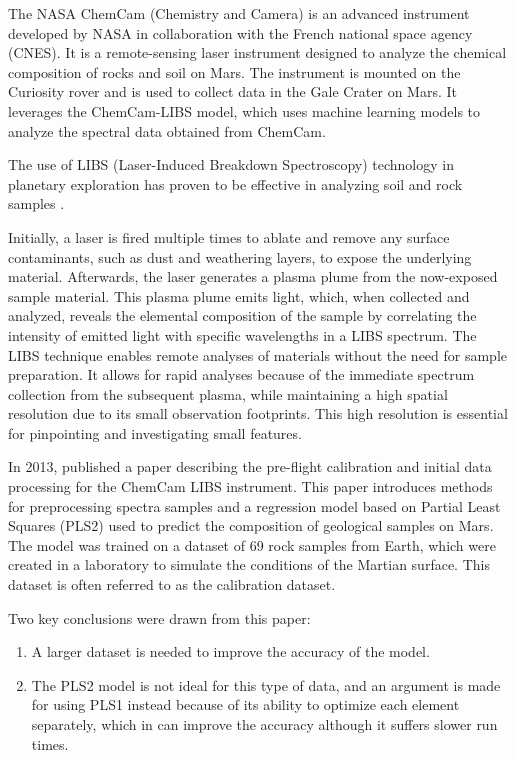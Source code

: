
The NASA ChemCam (Chemistry and Camera) is an advanced instrument developed by NASA in collaboration with the French national space agency (CNES).
It is a remote-sensing laser instrument designed to analyze the chemical composition of rocks and soil on Mars\cite{chemcam_nasa_website}.
The instrument is mounted on the Curiosity rover and is used to collect data in the Gale Crater on Mars\cite{curiosity_nasa_website}.
It leverages the ChemCam-LIBS model, which uses machine learning models to analyze the spectral data obtained from ChemCam.\cite{andersonImprovedAccuracyQuantitative2017}\cite{cleggRecalibrationMarsScience2017}

The use of LIBS (Laser-Induced Breakdown Spectroscopy) technology in planetary exploration has proven to be effective in analyzing soil and rock samples \cite{knight_characterization_2000}.

Initially, a laser is fired multiple times to ablate and remove any surface contaminants, such as dust and weathering layers, to expose the underlying material.
Afterwards, the laser generates a plasma plume from the now-exposed sample material.
This plasma plume emits light, which, when collected and analyzed, reveals the elemental composition of the sample by correlating the intensity of emitted light with specific wavelengths in a LIBS spectrum.
The LIBS technique enables remote analyses of materials without the need for sample preparation.
It allows for rapid analyses because of the immediate spectrum collection from the subsequent plasma, while maintaining a high spatial resolution due to its small observation footprints.
This high resolution is essential for pinpointing and investigating small features. \cite{wiens_chemcam_2012}

In 2013, \citeauthor{wiens_pre-flight_2013} published a paper describing the pre-flight calibration and initial data processing for the ChemCam LIBS instrument.
This paper introduces methods for preprocessing spectra samples and a regression model based on Partial Least Squares (PLS2) used to predict the composition of geological samples on Mars.
The model was trained on a dataset of 69 rock samples from Earth, which were created in a laboratory to simulate the conditions of the Martian surface.
This dataset is often referred to as the calibration dataset.

Two key conclusions were drawn from this paper:
\begin{enumerate}
    \item A larger dataset is needed to improve the accuracy of the model.
    \item The PLS2 model is not ideal for this type of data, and an argument is made for using PLS1 instead because of its ability to optimize each element separately, which in can improve the accuracy although it suffers slower run times.
\end{enumerate}

